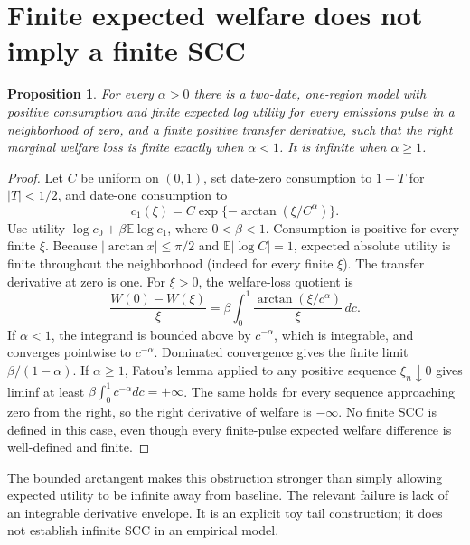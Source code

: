 \documentclass[11pt]{article}
\newtheorem{proposition}[theorem]{Proposition}
\newcommand{\E}{\mathbb E}
\begin{document}
\section{Finite expected welfare does not imply a finite SCC}
\begin{proposition}\label{tail}
For every $\alpha>0$ there is a two-date, one-region model with positive
consumption and finite expected log utility for every emissions pulse
in a neighborhood of zero, and a finite positive transfer derivative,
such that the right marginal welfare loss is finite exactly when
$\alpha<1$. It is infinite when $\alpha\geq1$.
\end{proposition}
\begin{proof}
Let $C$ be uniform on $(0,1)$, set date-zero consumption to $1+T$ for
$|T|<1/2$, and date-one consumption to
\[
 c_1(\xi)=C\exp\{-\arctan(\xi/C^\alpha)\}.
\]
Use utility $\log c_0+\beta\E\log c_1$, where $0<\beta<1$.
Consumption is positive for every finite $\xi$.
Because $|\arctan x|\leq\pi/2$ and $\E|\log C|=1$, expected absolute
utility is finite throughout the neighborhood (indeed for every finite
$\xi$). The transfer derivative at zero is one.
For $\xi>0$, the welfare-loss quotient is
\[
 \frac{W(0)-W(\xi)}\xi
 =\beta\int_0^1\frac{\arctan(\xi/c^\alpha)}\xi\,dc.           \tag{3}
\]
If $\alpha<1$, the integrand is bounded above by $c^{-\alpha}$,
which is integrable, and converges pointwise to $c^{-\alpha}$.
Dominated convergence gives the finite limit $\beta/(1-\alpha)$.
If $\alpha\geq1$, Fatou's lemma applied to any positive sequence
$\xi_n\downarrow0$ gives liminf at least
$\beta\int_0^1c^{-\alpha}dc=+\infty$. The same holds for every sequence
approaching zero from the right, so the right derivative of welfare is
$-\infty$. No finite SCC is defined in this case, even though every
finite-pulse expected welfare difference is well-defined and finite.
\end{proof}
The bounded arctangent makes this obstruction stronger than simply allowing
expected utility to be infinite away from baseline. The relevant failure
is lack of an integrable derivative envelope. It is an explicit toy tail
construction; it does not establish infinite SCC in an empirical model.
\end{document}
